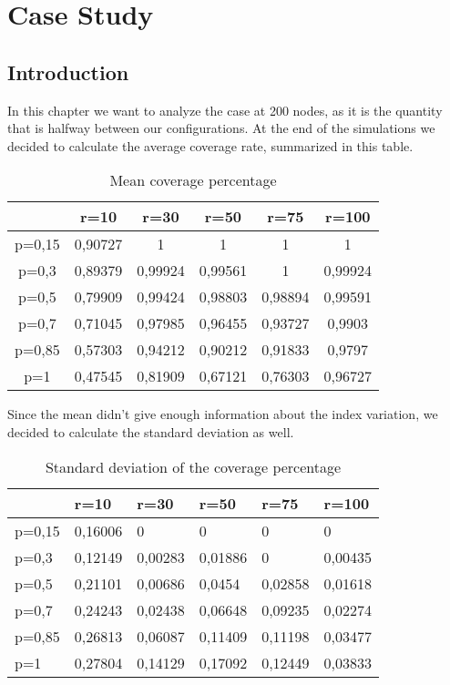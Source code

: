 \section{Case Study}
\subsection{Introduction}
In this chapter we want to analyze the case at 200 nodes, as it is the quantity that is halfway between our configurations. At the end of the simulations we decided to calculate the average coverage rate, summarized in this table.

\begin{table}[h!]
\centering
\begin{tabular}{|c|c|c|c|c|c|}
\hline
       & r=10    & r=30    & r=50    & r=75    & r=100   \\ \hline
p=0,15 & 0,90727 & 1       & 1       & 1       & 1       \\ \hline
p=0,3  & 0,89379 & 0,99924 & 0,99561 & 1       & 0,99924 \\ \hline
p=0,5  & 0,79909 & 0,99424 & 0,98803 & 0,98894 & 0,99591 \\ \hline
p=0,7  & 0,71045 & 0,97985 & 0,96455 & 0,93727 & 0,9903  \\ \hline
p=0,85 & 0,57303 & 0,94212 & 0,90212 & 0,91833 & 0,9797  \\ \hline
p=1    & 0,47545 & 0,81909 & 0,67121 & 0,76303 & 0,96727 \\ \hline
\end{tabular}
\caption{Mean coverage percentage}
\label{tab:my-table}
\end{table}

Since the mean didn't give enough information about the index variation, we decided to calculate the standard deviation as well.
\begin{table}[h!]
\centering
\begin{tabular}{|l|l|l|l|l|l|}
\hline
       & r=10    & r=30    & r=50    & r=75    & r=100   \\ \hline
p=0,15 & 0,16006 & 0       & 0       & 0       & 0       \\ \hline
p=0,3  & 0,12149 & 0,00283 & 0,01886 & 0       & 0,00435 \\ \hline
p=0,5  & 0,21101 & 0,00686 & 0,0454  & 0,02858 & 0,01618 \\ \hline
p=0,7  & 0,24243 & 0,02438 & 0,06648 & 0,09235 & 0,02274 \\ \hline
p=0,85 & 0,26813 & 0,06087 & 0,11409 & 0,11198 & 0,03477 \\ \hline
p=1    & 0,27804 & 0,14129 & 0,17092 & 0,12449 & 0,03833 \\ \hline
\end{tabular}
\caption{Standard deviation of the coverage percentage}
\label{tab:my-table}
\end{table}

